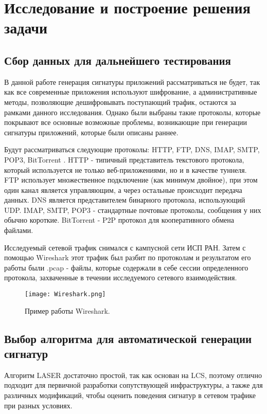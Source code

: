 \section{Исследование и построение решения задачи}
\label{sec:Section3} 

\subsection{Сбор данных для дальнейшего тестирования}

В данной работе генерация сигнатуры приложений рассматриваться не будет,
так как все современные приложения используют шифрование, а административные методы,
позволяющие дешифровывать поступающий трафик, остаются за рамками данного исследования.
Однако были выбраны такие протоколы, которые покрывают все основные возможные проблемы,
возникающие при генерации сигнатуры приложений, которые были описаны раннее.

Будут рассматриваться следующие протоколы: HTTP, FTP, DNS, IMAP, SMTP, POP3, BitTorrent \cite{Bittorent}.
HTTP - типичный представитель текстового протокола, который используется не только веб-приложениями,
но и в качестве туннеля.
FTP использует множественное подключение (как минимум двойное), при этом один канал является управляющим,
а через остальные происходит передача данных. DNS является представителем бинарного протокола, использующий UDP.
IMAP, SMTP, POP3 - стандартные почтовые протоколы, сообщения у них обычно короткие.
BitTorrent - P2P протокол для кооперативного обмена файлами.

Исследуемый сетевой трафик снимался с кампусной сети ИСП РАН. Затем с помощью Wireshark \cite{Wireshark}
этот трафик был разбит по протоколам и результатом его работы были .pcap - файлы,
которые содержали в себе сессии определенного протокола, захваченные в течении исследуемого сетевого взаимодействия.

\begin{figure}[H]
    \begin{center}
        \texttt{[image: Wireshark.png]}
        \caption{Пример работы Wireshark.}
    \end{center}
\end{figure}

\subsection{Выбор алгоритма для автоматической генерации сигнатур}
Алгоритм LASER достаточно простой, так как основан на LCS, поэтому отлично подходит для первичной разработки сопутствующей инфраструктуры,
а также для различных модификаций, чтобы оценить поведения сигнатур в сетевом трафике при разных условиях.


